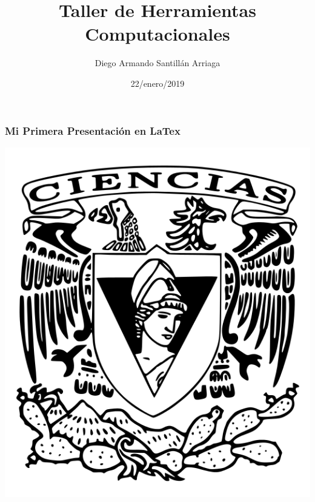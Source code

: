 \documentclass{beamer}
\title{Taller de Herramientas Computacionales}
\author{Diego Armando Santillán Arriaga}
\date{22/enero/2019}
\begin{document}
	\maketitle
	
\begin{frame}
    \frametitle{Mi Primera Presentación en LaTex}
    \begin{center}
    \includegraphics[scale=0.20]{1.png}
    \end{center}
\end{frame}
\end{document}
